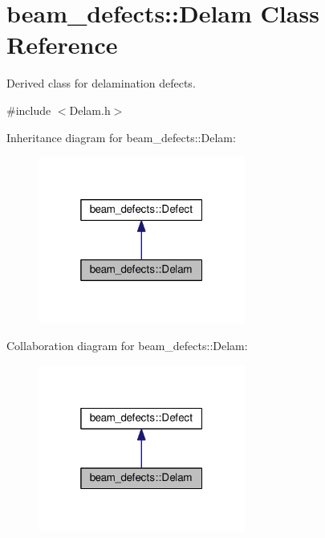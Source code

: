 \hypertarget{classbeam__defects_1_1_delam}{}\section{beam\+\_\+defects\+:\+:Delam Class Reference}
\label{classbeam__defects_1_1_delam}


Derived class for delamination defects.  




{\ttfamily \#include $<$Delam.\+h$>$}



Inheritance diagram for beam\+\_\+defects\+:\+:Delam\+:\nopagebreak
\begin{figure}[H]
\begin{center}
\leavevmode
\includegraphics[width=193pt]{classbeam__defects_1_1_delam__inherit__graph}
\end{center}
\end{figure}


Collaboration diagram for beam\+\_\+defects\+:\+:Delam\+:\nopagebreak
\begin{figure}[H]
\begin{center}
\leavevmode
\includegraphics[width=193pt]{classbeam__defects_1_1_delam__coll__graph}
\end{center}
\end{figure}
